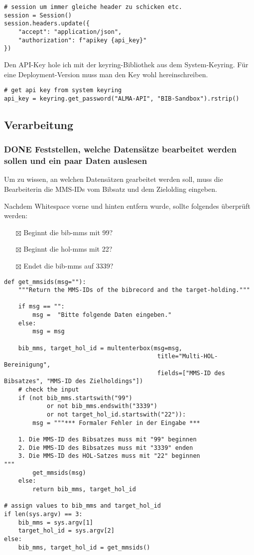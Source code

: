\documentclass[10pt, a4paper]{scrartcl}
\begin{document}
\begin{verbatim}
# session um immer gleiche header zu schicken etc.
session = Session()
session.headers.update({
    "accept": "application/json",
    "authorization": f"apikey {api_key}"
})
\end{verbatim}

Den API-Key hole ich mit der keyring-Bibliothek aus dem System-Keyring.
Für eine Deployment-Version muss man den Key wohl hereinschreiben.

\begin{verbatim}
# get api key from system keyring
api_key = keyring.get_password("ALMA-API", "BIB-Sandbox").rstrip()
\end{verbatim}

\subsection{Verarbeitung}
\label{sec:orgce2d7d8}
\subsubsection{{\bfseries\sffamily DONE} Feststellen, welche Datensätze bearbeitet werden sollen und ein paar Daten auslesen}
\label{sec:org434b757}
Um zu wissen, an welchen Datensätzen gearbeitet werden soll, muss die
Bearbeiterin die MMS-IDs vom Bibsatz und dem Zielolding eingeben.

Nachdem Whitespace vorne und hinten entfern wurde, sollte folgendes
überprüft werden:
\begin{itemize}
\item[{$\boxtimes$}] Beginnt die bib-mms mit 99?
\item[{$\boxtimes$}] Beginnt die hol-mms mit 22?
\item[{$\boxtimes$}] Endet die bib-mms auf 3339?
\end{itemize}
\begin{verbatim}
def get_mmsids(msg=""):
    """Return the MMS-IDs of the bibrecord and the target-holding."""

    if msg == "":
        msg =  "Bitte folgende Daten eingeben."
    else:
        msg = msg

    bib_mms, target_hol_id = multenterbox(msg=msg,
                                           title="Multi-HOL-Bereinigung",
                                           fields=["MMS-ID des Bibsatzes", "MMS-ID des Zielholdings"])
    # check the input
    if (not bib_mms.startswith("99")
            or not bib_mms.endswith("3339")
            or not target_hol_id.startswith("22")):
        msg = """*** Formaler Fehler in der Eingabe ***

    1. Die MMS-ID des Bibsatzes muss mit "99" beginnen
    2. Die MMS-ID des Bibsatzes muss mit "3339" enden
    3. Die MMS-ID des HOL-Satzes muss mit "22" beginnen
"""
        get_mmsids(msg)
    else:
        return bib_mms, target_hol_id

# assign values to bib_mms and target_hol_id
if len(sys.argv) == 3:
    bib_mms = sys.argv[1]
    target_hol_id = sys.argv[2]
else:
    bib_mms, target_hol_id = get_mmsids()
\end{verbatim}
\end{document}
